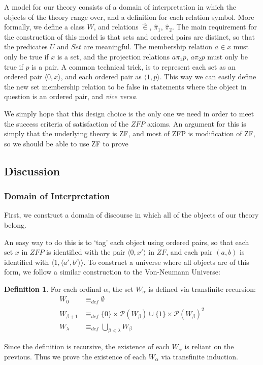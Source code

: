 \documentclass[11pt]{report}
\newcommand{\eqdef}{\equiv_\mathit{def}}
\newcommand{\pleft}{\mathrel{\pi_1}}
\newcommand{\pright}{\mathrel{\pi_2}}
\newcommand{\pair}[2]{\langle #1,#2 \rangle}
\newcommand{\zin}{\mathrel{\widehat{\in}}}
\newcommand{\zpright}{\mathrel{\widehat{\pi}_2}}
\newcommand{\zpleft}{\mathrel{\widehat{\pi}_1}}
\theoremstyle{definition}
\theoremstyle{theorem}
\theoremstyle{lemma}
\newtheorem{definition}{Definition}[section]
\begin{document}
A model for our theory consists of a domain of interpretation in which the objects of the theory range over, and a definition for each relation symbol.
More formally, we define a class $W$, and relations $\zin$, $\zpleft$, $\zpright$. 
The main requirement for the construction of this model is that sets and ordered pairs are distinct, so that the predicates $U$ and $\mathit{Set}$ are meaningful.
The membership relation $a\in x$ must only be true if $x$ is a set, and the projection relations $a\pleft p$, $a\pright p$ must only be true if $p$ is a pair.
A common technical trick, is to represent each set as an ordered pair $\pair{0}{x}$, and each ordered pair as $\pair{1}{p}$.
This way we can easily define the new set membership relation to be false in statements where the object in question is an ordered pair, and \emph{vice versa}. 

We simply hope that this design choice is the only one we need in order to meet the success criteria of satisfaction of the $\mathit{ZFP}$ axioms. 
An argument for this is simply that the underlying theory is ZF, and most of ZFP is modification of ZF, so we should be able to use ZF to prove 

\subsection{Discussion}\label{zfpmodel}

\subsubsection{Domain of Interpretation}
First, we construct a domain of discourse in which all of the objects of our theory belong.

An easy way to do this is to `tag' each object using ordered pairs, so that each set $x$ in $\mathit{ZFP}$ is identified with the pair $\pair{0}{x'}$ in $\mathit{ZF}$, and each pair $(a,b)$ is identified with $\pair{1}{\pair{a'}{b'}}$. To construct a universe where all objects are of this form, we follow a similar construction to the Von-Neumann Universe:

\begin{definition} For each ordinal $\alpha$, the set $W_\alpha$ is defined via transfinite recursion:
\begin{align*}
 W_0 &\eqdef \emptyset\\
 W_{\beta+1} &\eqdef \{0\}\times\mathcal{P}(W_\beta) \cup \{1\}\times \mathcal{P}(W_\beta)^2 \\
 W_\lambda &\eqdef \bigcup_{\beta < \lambda} W_\beta
\end{align*}
\end{definition}
\noindent
Since the definition is recursive, the existence of each $W_\alpha$ is reliant on the previous. Thus we prove the existence of each $W_\alpha$ via transfinite induction.
\end{document}
